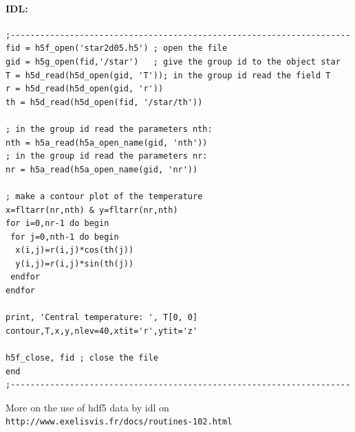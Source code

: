 \paragraph{IDL:}
\begin{verbatim}
;---------------------------------------------------------------------
fid = h5f_open('star2d05.h5') ; open the file
gid = h5g_open(fid,'/star')   ; give the group id to the object star
T = h5d_read(h5d_open(gid, 'T')); in the group id read the field T
r = h5d_read(h5d_open(gid, 'r'))
th = h5d_read(h5d_open(fid, '/star/th'))

; in the group id read the parameters nth:
nth = h5a_read(h5a_open_name(gid, 'nth'))
; in the group id read the parameters nr:
nr = h5a_read(h5a_open_name(gid, 'nr'))

; make a contour plot of the temperature
x=fltarr(nr,nth) & y=fltarr(nr,nth)
for i=0,nr-1 do begin
 for j=0,nth-1 do begin
  x(i,j)=r(i,j)*cos(th(j))
  y(i,j)=r(i,j)*sin(th(j))
 endfor
endfor

print, 'Central temperature: ', T[0, 0]
contour,T,x,y,nlev=40,xtit='r',ytit='z'

h5f_close, fid ; close the file
end
;---------------------------------------------------------------------
\end{verbatim}

More on the use of hdf5 data by idl on {\tt
http://www.exelisvis.fr/docs/routines-102.html}

